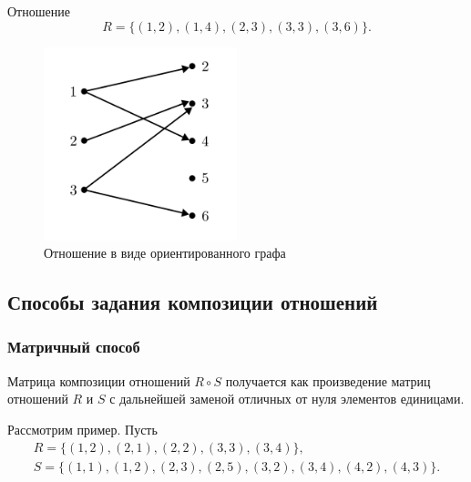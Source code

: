 \documentclass[a5paper, 11pt]{extarticle}
\theoremstyle{definition}
\theoremstyle{definition}
\theoremstyle{definition}
\numberwithin{figure}{section}
\numberwithin{table}{section}
\begin{document}
Отношение
\[
    R = \{(1, 2), (1, 4), (2, 3), (3, 3), (3, 6)\}.
\]
\begin{figure}[H]
    \centering
    \includegraphics[width=0.5\textwidth]{images/relation-graph.png}
    \caption{Отношение в виде ориентированного графа}
\end{figure}

\subsection{Способы задания композиции отношений}

\subsubsection{Матричный способ}

Матрица композиции отношений \(R \circ S\) получается как произведение матриц отношений \(R\) и \(S\) с дальнейшей заменой отличных от нуля элементов единицами.

Рассмотрим пример. Пусть
\begin{gather*}
    R = \{(1, 2), (2, 1), (2, 2), (3, 3), (3, 4)\},
    \\
    S = \{(1, 1), (1, 2), (2, 3), (2, 5), (3, 2), (3, 4), (4, 2), (4, 3)\}.
\end{gather*}
\end{document}
